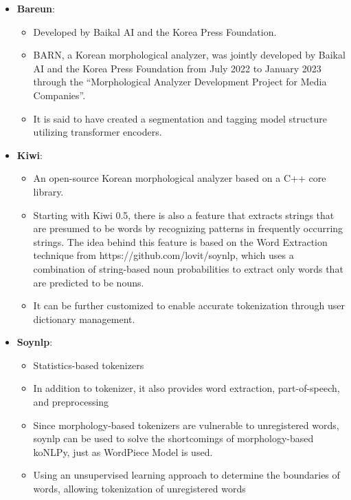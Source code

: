 \documentclass{article}
\begin{document}
\begin{itemize}
    \item \textbf{Bareun}: 
        \begin{itemize}
            \item Developed by Baikal AI and the Korea Press Foundation.
            \item BARN, a Korean morphological analyzer, was jointly developed by Baikal AI and the Korea Press Foundation from July 2022 to January 2023 through the “Morphological Analyzer Development Project for Media Companies”.
            \item It is said to have created a segmentation and tagging model structure utilizing transformer encoders.
        \end{itemize}
        
    \item \textbf{Kiwi}: 
        \begin{itemize}
            \item An open-source Korean morphological analyzer based on a C++ core library.
            \item Starting with Kiwi 0.5, there is also a feature that extracts strings that are presumed to be words by recognizing patterns in frequently occurring strings. The idea behind this feature is based on the Word Extraction technique from https://github.com/lovit/soynlp, which uses a combination of string-based noun probabilities to extract only words that are predicted to be nouns.
            \item It can be further customized to enable accurate tokenization through user dictionary management.
        \end{itemize}
    \item \textbf{Soynlp}: 
        \begin{itemize}
            \item Statistics-based tokenizers
            \item In addition to tokenizer, it also provides word extraction, part-of-speech, and preprocessing
            \item Since morphology-based tokenizers are vulnerable to unregistered words, soynlp can be used to solve the shortcomings of morphology-based koNLPy, just as WordPiece Model is used.
            \item Using an unsupervised learning approach to determine the boundaries of words, allowing tokenization of unregistered words
        \end{itemize}
\end{itemize}
\end{document}

